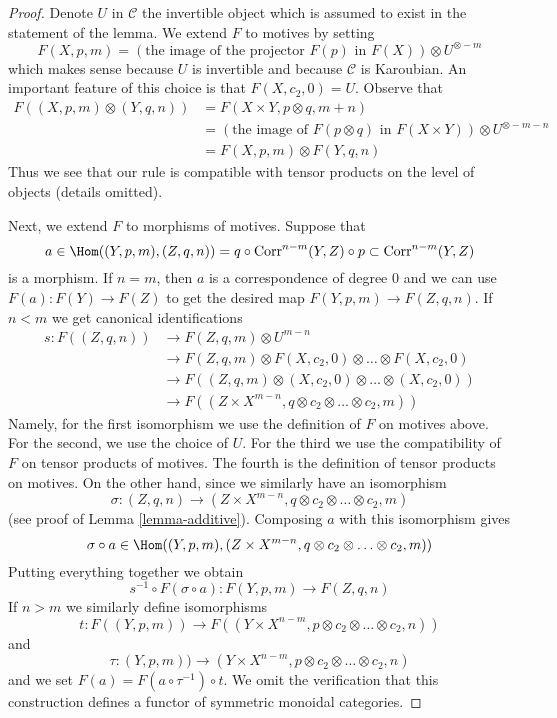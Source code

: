 \begin{proof}
Denote $U$ in $\mathcal{C}$ the invertible object which is assumed to exist
in the statement of the lemma. We extend $F$ to motives by setting
$$
F(X, p, m) = \left(\text{the image of
the projector }F(p)\text{ in }F(X)\right) \otimes U^{\otimes -m}
$$
which makes sense because $U$ is invertible and because $\mathcal{C}$
is Karoubian. An important feature of this choice is that
$F(X, c_2, 0) = U$. Observe that
\begin{align*}
F((X, p, m) \otimes (Y, q, n))
& =
F(X \times Y, p \otimes q, m + n) \\
& =
\left(\text{the image of }F(p \otimes q)\text{ in }F(X \times Y)\right)
\otimes U^{\otimes -m - n} \\
& =
F(X, p, m) \otimes F(Y, q, n)
\end{align*}
Thus we see that our rule is compatible with tensor products on
the level of objects (details omitted).

\medskip\noindent
Next, we extend $F$ to morphisms of motives. Suppose that
$$
a \in
\Hom((Y, p, m), (Z, q, n)) =
q \circ \text{Corr}^{n - m}(Y, Z) \circ p \subset \text{Corr}^{n - m}(Y, Z)
$$
is a morphism. If $n = m$, then $a$ is a correspondence of degree $0$
and we can use $F(a) : F(Y) \to F(Z)$ to get the desired map
$F(Y, p, m) \to F(Z, q, n)$. If $n < m$ we get canonical identifications
\begin{align*}
s : F((Z, q, n))
& \to
F(Z, q, m) \otimes U^{m - n} \\
& \to
F(Z, q, m) \otimes F(X, c_2, 0) \otimes \ldots \otimes F(X, c_2, 0) \\
& \to
F((Z, q, m) \otimes (X, c_2, 0) \otimes \ldots \otimes (X, c_2, 0)) \\
& \to
F((Z \times X^{m - n}, q \otimes c_2 \otimes \ldots \otimes c_2, m))
\end{align*}
Namely, for the first isomorphism we use the definition of $F$ on motives
above. For the second, we use the choice of $U$. For the third we use
the compatibility of $F$ on tensor products of motives. The fourth
is the definition of tensor products on motives. On the other hand, since
we similarly have an isomorphism
$$
\sigma : (Z, q, n) \to
(Z \times X^{m - n}, q \otimes c_2 \otimes \ldots \otimes c_2, m)
$$
(see proof of Lemma \ref{lemma-additive}). Composing $a$ with this isomorphism
gives
$$
\sigma \circ a \in
\Hom((Y, p, m),
(Z \times X^{m - n}, q \otimes c_2 \otimes \ldots \otimes c_2, m))
$$
Putting everything together we obtain
$$
s^{-1} \circ F(\sigma \circ a) :
F(Y, p, m) \to
F(Z, q, n)
$$
If $n > m$ we similarly define isomorphisms
$$
t : F((Y, p, m)) \to
F((Y \times X^{n - m}, p \otimes c_2 \otimes \ldots \otimes c_2, n))
$$
and
$$
\tau : (Y, p, m)) \to
(Y \times X^{n - m}, p \otimes c_2 \otimes \ldots \otimes c_2, n)
$$
and we set $F(a) = F(a \circ \tau^{-1}) \circ t$.
We omit the verification that this construction defines a functor
of symmetric monoidal categories.
\end{proof}

